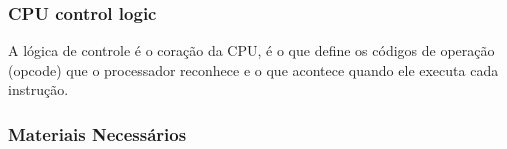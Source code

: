 \subsubsection{CPU control logic}
A lógica de controle é o coração da CPU, é o que define os códigos de operação (opcode) que o processador reconhece e o que acontece quando ele executa cada instrução.

\subsubsection{Materiais Necessários}

\newpage


